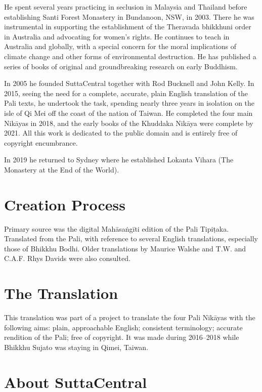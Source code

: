 \documentclass[12pt,openany]{book}%
\begin{document}
He spent several years practicing in seclusion in Malaysia and Thailand before establishing Santi Forest Monastery in Bundanoon, NSW, in 2003. There he was instrumental in supporting the establishment of the Theravada bhikkhuni order in Australia and advocating for women’s rights. He continues to teach in Australia and globally, with a special concern for the moral implications of climate change and other forms of environmental destruction. He has published a series of books of original and groundbreaking research on early Buddhism. 

In 2005 he founded SuttaCentral together with Rod Bucknell and John Kelly. In 2015, seeing the need for a complete, accurate, plain English translation of the Pali texts, he undertook the task, spending nearly three years in isolation on the isle of Qi Mei off the coast of the nation of Taiwan. He completed the four main \textsanskrit{Nikāyas} in 2018, and the early books of the Khuddaka \textsanskrit{Nikāya} were complete by 2021. All this work is dedicated to the public domain and is entirely free of copyright encumbrance. 

In 2019 he returned to Sydney where he established Lokanta Vihara (The Monastery at the End of the World). 

\section*{Creation Process}

Primary source was the digital \textsanskrit{Mahāsaṅgīti} edition of the Pali \textsanskrit{Tipiṭaka}. Translated from the Pali, with reference to several English translations, especially those of Bhikkhu Bodhi. Older translations by Maurice Walshe and T.W. and C.A.F. Rhys Davids were also consulted.

\section*{The Translation}

This translation was part of a project to translate the four Pali \textsanskrit{Nikāyas} with the following aims: plain, approachable English; consistent terminology; accurate rendition of the Pali; free of copyright. It was made during 2016–2018 while Bhikkhu Sujato was staying in Qimei, Taiwan.

\section*{About SuttaCentral}
\end{document}
